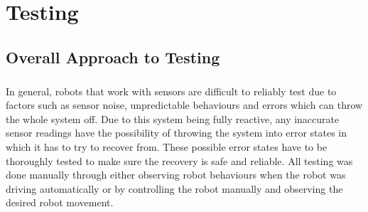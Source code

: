 \chapter{Testing}

%
%
%
%
%

\section{Overall Approach to Testing}
\paragraph{}
In general, robots that work with sensors are difficult to reliably test due to factors such as sensor noise, unpredictable behaviours and errors which can throw the whole system off. Due to this system being fully reactive, any inaccurate sensor readings have the possibility of throwing the system into error states in which it has to try to recover from. These possible error states have to be thoroughly tested to make sure the recovery is safe and reliable. All testing was done manually through either observing robot behaviours when the robot was driving automatically or by controlling the robot manually and observing the desired robot movement.

